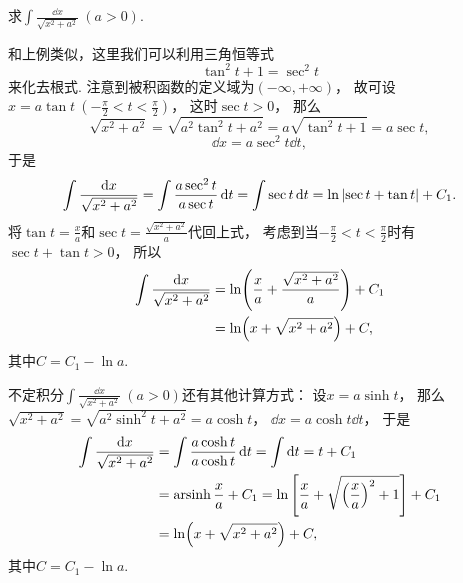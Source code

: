 \begin{example}
求\(\int \frac{\dd{x}}{\sqrt{x^2 + a^2}}\ (a>0)\).
\begin{solution}
和上例类似，这里我们可以利用三角恒等式\[
	\tan^2t+1=\sec^2t
\]来化去根式.
注意到被积函数的定义域为\((-\infty,+\infty)\)，
故可设\(x = a \tan t\ (-\frac\pi2 < t < \frac\pi2)\)，
这时\(\sec t > 0\)，
那么\[
	\sqrt{x^2 + a^2}
	= \sqrt{a^2 \tan^2 t + a^2}
	= a \sqrt{\tan^2 t + 1}
	= a \sec t,
\]\[
	\dd{x} = a \sec^2 t \dd{t},
\]
于是\[
	\int \frac{\dd{x}}{\sqrt{x^2 + a^2}}
	= \int \frac{a \sec^2 t}{a \sec t} \dd{t}
	= \int \sec t \dd{t}
	= \ln\abs{\sec t + \tan t} + C_1.
\]
将\(\tan t = \frac{x}{a}\)和\(\sec t = \frac{\sqrt{x^2+a^2}}{a}\)代回上式，
考虑到当\(-\frac\pi2 < t < \frac\pi2\)时有\(\sec t + \tan t > 0\)，
所以\begin{align}
	\int \frac{\dd{x}}{\sqrt{x^2 + a^2}}
	&= \ln( \frac{x}{a} + \frac{\sqrt{x^2 + a^2}}{a} ) + C_1 \notag \\
	&= \ln(x + \sqrt{x^2 + a^2}) + C,
\end{align}
其中\(C = C_1 - \ln a\).
\end{solution}
\end{example}
\begin{remark}
不定积分\(\int \frac{\dd{x}}{\sqrt{x^2 + a^2}}\ (a>0)\)还有其他计算方式：
设\(x = a \sinh t\)，
那么\(\sqrt{x^2+a^2}
=\sqrt{a^2\sinh^2t+a^2}
=a\cosh t\)，
\(\dd{x}=a\cosh t\dd{t}\)，
于是\begin{align*}
	\int\frac{\dd{x}}{\sqrt{x^2+a^2}}
	&= \int\frac{a\cosh t}{a\cosh t}\dd{t}
	= \int\dd{t}
	= t+C_1 \\
	&= \operatorname{arsinh}\frac{x}{a} + C_1
	= \ln\left[\frac{x}{a}+\sqrt{\left(\frac{x}{a}\right)^2+1}\right] + C_1 \\
	&= \ln(x+\sqrt{x^2+a^2})+C,
\end{align*}
其中\(C=C_1-\ln a\).
\end{remark}


